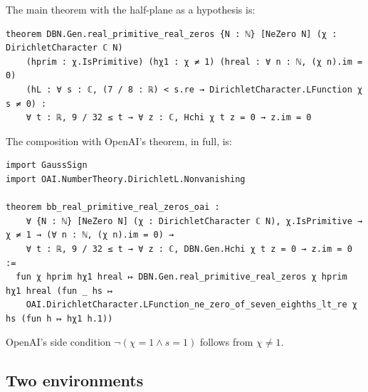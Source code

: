 \documentclass[11pt]{article}
\theoremstyle{definition}
\begin{document}
The main theorem with the half-plane as a hypothesis is:
\begin{lstlisting}
theorem DBN.Gen.real_primitive_real_zeros {N : ℕ} [NeZero N] (χ : DirichletCharacter ℂ N)
    (hprim : χ.IsPrimitive) (hχ1 : χ ≠ 1) (hreal : ∀ n : ℕ, (χ n).im = 0)
    (hL : ∀ s : ℂ, (7 / 8 : ℝ) < s.re → DirichletCharacter.LFunction χ s ≠ 0) :
    ∀ t : ℝ, 9 / 32 ≤ t → ∀ z : ℂ, Hchi χ t z = 0 → z.im = 0
\end{lstlisting}
\noindent
The composition with OpenAI's theorem, in full, is:
\begin{lstlisting}
import GaussSign
import OAI.NumberTheory.DirichletL.Nonvanishing

theorem bb_real_primitive_real_zeros_oai :
    ∀ {N : ℕ} [NeZero N] (χ : DirichletCharacter ℂ N), χ.IsPrimitive → χ ≠ 1 → (∀ n : ℕ, (χ n).im = 0) →
    ∀ t : ℝ, 9 / 32 ≤ t → ∀ z : ℂ, DBN.Gen.Hchi χ t z = 0 → z.im = 0 :=
  fun χ hprim hχ1 hreal ↦ DBN.Gen.real_primitive_real_zeros χ hprim hχ1 hreal (fun _ hs ↦
    OAI.DirichletCharacter.LFunction_ne_zero_of_seven_eighths_lt_re χ hs (fun h ↦ hχ1 h.1))
\end{lstlisting}
\noindent
OpenAI's side condition $\neg(\chi = 1 \wedge s = 1)$ follows from $\chi \ne 1$.

\subsection{Two environments}
\end{document}

